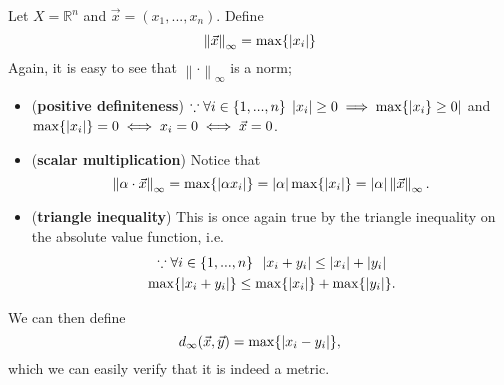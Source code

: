 \documentclass[notoc,notitlepage]{tufte-book}
\newcommand{\norm}[1]{\left\| #1 \right\|}
\begin{document}
\begin{eg}
  Let $X = \mathbb{R}^n$ and $\vec{x} = ( x_1, ..., x_n )$. Define
  \begin{equation*}
    \norm{\vec{x}}_\infty = \max \{ \abs{x_i} \}
  \end{equation*}
  Again, it is easy to see that $\norm\cdot_\infty$ is a norm;
  \begin{itemize}
    \item (\textbf{positive definiteness}) $\because \forall i \in \{ 1, ..., n \} \; \left|x_i\right| \geq 0 \implies \max \{ \left|x_i \} \geq 0\right|$ and $\max \{ \left|x_i\right| \} = 0 \iff x_i = 0 \iff \vec{x} = 0$.
    \item (\textbf{scalar multiplication}) Notice that
      \begin{equation*}
        \norm{\alpha \cdot \vec{x}}_\infty = \max \{ \abs{\alpha x_i} \} = \abs{\alpha} \max \{ \abs{x_i} \} = \abs{\alpha} \norm{\vec{x}}_\infty.
      \end{equation*}
    \item (\textbf{triangle inequality}) This is once again true by the triangle inequality on the absolute value function, i.e.
      \begin{gather*}
        \because \forall i \in \{ 1, ..., n \} \enspace \left|x_i + y_i\right| \leq \left|x_i\right| + \left|y_i\right| \\
        \max \{ \left|x_i + y_i\right| \} \leq \max \{ \left|x_i\right| \} + \max \{ \left|y_i\right| \}.
      \end{gather*}
  \end{itemize}
  We can then define
  \begin{equation*}
    d_\infty(\vec{x}, \vec{y}) = \max \{ \left|x_i - y_i\right| \},
  \end{equation*}
  which we can easily verify that it is indeed a metric.
\end{eg}
\end{document}

